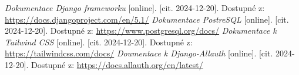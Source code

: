 \documentclass[12pt, a4paper,
twoside,        %
openright
]{report}
\begin{document}
	
	\renewcommand{\bibname}{Seznam použitých zdrojů}
	\begin{thebibliography}{99}
		\textit{Dokumentace Django frameworku} [online]. [cit. 2024-12-20]. Dostupné z: \url{https://docs.djangoproject.com/en/5.1/}
		\textit{Dokumentace PostreSQL} [online]. [cit. 2024-12-20]. Dostupné z: \url{https://www.postgresql.org/docs/}
		\textit{Dokumentace k Tailwind CSS} [online]. [cit. 2024-12-20]. Dostupné z: \url{https://tailwindcss.com/docs/}
		 \textit{Doumentace k Django-Allauth} [online]. [cit. 2024-12-20]. Dostupné z: \url{https://docs.allauth.org/en/latest/}
	\end{thebibliography}
	
	\clearpage
	
	\listoffigures
	
\end{document}
